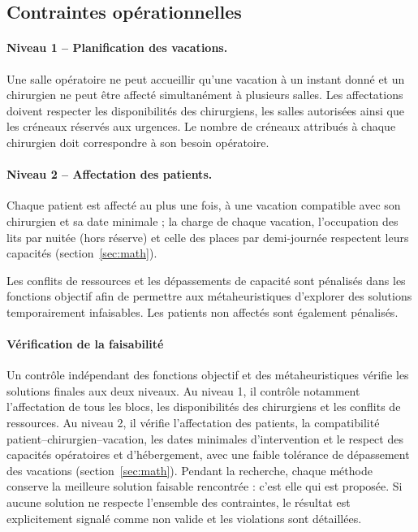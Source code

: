 \documentclass[11pt,a4paper]{article}
\begin{document}
\subsection{Contraintes opérationnelles}

\paragraph{Niveau 1 -- Planification des vacations.}
Une salle opératoire ne peut accueillir qu'une vacation à un instant donné et un chirurgien ne peut être affecté simultanément à plusieurs salles. Les affectations doivent respecter les disponibilités des chirurgiens, les salles autorisées ainsi que les créneaux réservés aux urgences. Le nombre de créneaux attribués à chaque chirurgien doit correspondre à son besoin opératoire.

\paragraph{Niveau 2 -- Affectation des patients.}
Chaque patient est affecté au plus une fois, à une vacation compatible avec son chirurgien et sa date minimale ; la charge de chaque vacation, l'occupation des lits par nuitée (hors réserve) et celle des places par demi-journée respectent leurs capacités (section~\ref{sec:math}).

Les conflits de ressources et les dépassements de capacité sont pénalisés dans les fonctions objectif afin de permettre aux métaheuristiques d'explorer des solutions temporairement infaisables. Les patients non affectés sont également pénalisés.

\paragraph{Vérification de la faisabilité} Un contrôle indépendant des fonctions objectif et des métaheuristiques vérifie les solutions finales aux deux niveaux. Au niveau 1, il contrôle notamment l'affectation de tous les blocs, les disponibilités des chirurgiens et les conflits de ressources. Au niveau 2, il vérifie l'affectation des patients, la compatibilité patient–chirurgien–vacation, les dates minimales d'intervention et le respect des capacités opératoires et d'hébergement, avec une faible tolérance de dépassement des vacations (section~\ref{sec:math}). Pendant la recherche, chaque méthode conserve la meilleure solution faisable rencontrée : c'est elle qui est proposée. Si aucune solution ne respecte l'ensemble des contraintes, le résultat est explicitement signalé comme non valide et les violations sont détaillées.
\end{document}
